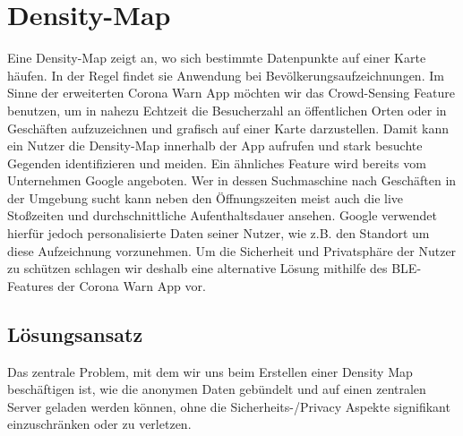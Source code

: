 \documentclass[conference,compsoc]{IEEEtran}
\begin{document}
\section{Density-Map}
\label{Density_Map}
Eine Density-Map zeigt an, wo sich bestimmte Datenpunkte auf einer Karte häufen. 
In der Regel findet sie Anwendung bei Bevölkerungsaufzeichnungen. 
Im Sinne der erweiterten Corona Warn App möchten wir das Crowd-Sensing Feature benutzen, 
um in nahezu Echtzeit die Besucherzahl an öffentlichen Orten oder in Geschäften aufzuzeichnen und grafisch auf einer Karte darzustellen. 
Damit kann ein Nutzer die Density-Map innerhalb der App aufrufen und stark besuchte Gegenden identifizieren und meiden. 
Ein ähnliches Feature wird bereits vom Unternehmen Google angeboten. \cite{GoogleStosszeiten} 
Wer in dessen Suchmaschine nach Geschäften in der Umgebung sucht kann neben den Öffnungszeiten meist auch die live Stoßzeiten und durchschnittliche Aufenthaltsdauer ansehen. 
Google verwendet hierfür jedoch personalisierte Daten seiner Nutzer, wie z.B. den Standort um diese Aufzeichnung vorzunehmen. 
Um die Sicherheit und Privatsphäre der Nutzer zu schützen schlagen wir deshalb eine alternative Lösung mithilfe des BLE-Features der Corona Warn App vor. \\

\subsection{Lösungsansatz} \label{Lösungsansatz}
Das zentrale Problem, mit dem wir uns beim Erstellen einer Density Map beschäftigen ist, 
wie die anonymen Daten gebündelt und auf einen zentralen Server geladen werden können, ohne die Sicherheits-/Privacy Aspekte signifikant einzuschränken oder zu verletzen. 
\end{document}

